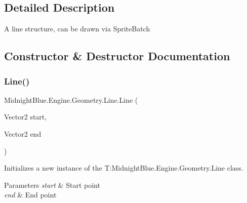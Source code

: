 \subsection{Detailed Description}
A line structure, can be drawn via Sprite\+Batch 



\subsection{Constructor \& Destructor Documentation}
\hypertarget{class_midnight_blue_1_1_engine_1_1_geometry_1_1_line_ab403e1024d5f0f3f35f8f30982d42120}{}\label{class_midnight_blue_1_1_engine_1_1_geometry_1_1_line_ab403e1024d5f0f3f35f8f30982d42120} 
\subsubsection{\texorpdfstring{Line()}{Line()}\hspace{0.1cm}{\footnotesize\ttfamily [1/2]}}
{\footnotesize\ttfamily Midnight\+Blue.\+Engine.\+Geometry.\+Line.\+Line (\begin{DoxyParamCaption}\item[{Vector2}]{start,  }\item[{Vector2}]{end }\end{DoxyParamCaption})\hspace{0.3cm}{\ttfamily [inline]}}



Initializes a new instance of the T\+:\+Midnight\+Blue.\+Engine.\+Geometry.\+Line class. 


\begin{DoxyParams}{Parameters}
{\em start} & Start point\\
\hline
{\em end} & End point\\
\hline
\end{DoxyParams}
\hypertarget{class_midnight_blue_1_1_engine_1_1_geometry_1_1_line_a5a5555d66e78f3edbd676be9fb97cc63}{}\label{class_midnight_blue_1_1_engine_1_1_geometry_1_1_line_a5a5555d66e78f3edbd676be9fb97cc63} 
